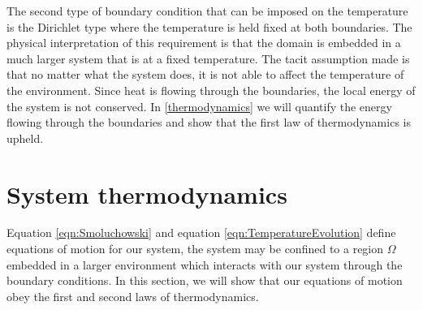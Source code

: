 The second type of boundary condition that can be imposed on the temperature is the Dirichlet type where the temperature is held fixed at both boundaries. The physical interpretation of this requirement is that the domain is embedded in a much larger system that is at a fixed temperature. The tacit assumption made is that no matter what the system does, it is not able to affect the temperature of the environment. Since heat is flowing through the boundaries, the local energy of the system is not conserved. In \autoref{thermodynamics} we will quantify the energy flowing through the boundaries and show that the first law of thermodynamics is upheld.
\section{System thermodynamics} \label{thermodynamics}
Equation \ref{eqn:Smoluchowski} and equation \ref{eqn:TemperatureEvolution} define equations of motion for our system, the system may be confined to a region $\Omega$ embedded in a larger environment which interacts with our system through the boundary conditions. In this section, we will show that our equations of motion obey the first and second laws of thermodynamics.

